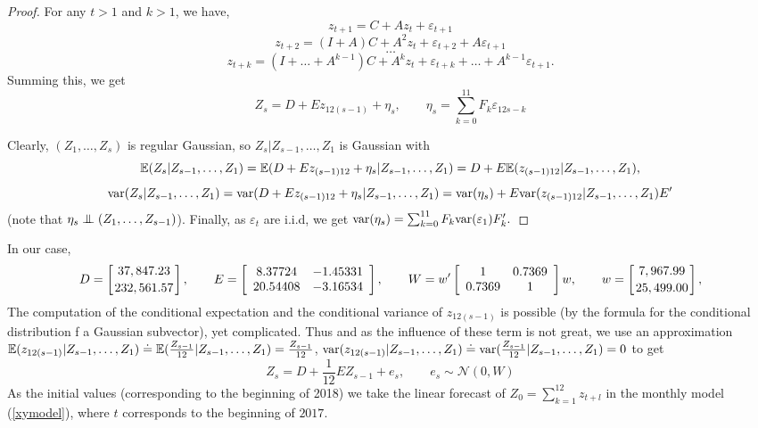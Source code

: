 \documentclass[3p,times]{elsarticle}
\begin{document}
\begin{proof} For any $t>1$ and $k>1$, we have,
$$z_{t+1}=C + A z_{t} + \varepsilon_{t+1}$$
$$z_{t+2}=(I+A)C + A^2 z_{t} + \varepsilon_{t+2}+ A \varepsilon_{t+1}$$
$$\dots$$
$$
z_{t+k} = (I+\dots+A^{k-1}) C + A^k z_t + \varepsilon_{t+k} + \dots + A^{k-1} \varepsilon_{t+1}.
$$
Summing this, we get 
$$
Z_s = D + E z_{12(s-1)}+\eta_s, 
\qquad
\eta_s = \sum_{k=0}^{11} F_k \varepsilon_{12s-k} 
$$


Clearly, $(Z_1,\dots,Z_s)$ is regular Gaussian, so $Z_s|Z_{s-1},\dots,Z_1$ is  Gaussian with
$$
\mathbb{E}(Z_{s}|Z_{s-1},\dots,Z_1)=
\mathbb{E}(D+Ez_{(s-1)12}+\eta_s|Z_{s-1},\dots,Z_1)
=D + E\mathbb{E}(z_{(s-1)12}|Z_{s-1},\dots,Z_1),
$$
$$
\mathrm{var}(Z_{s}|Z_{s-1},\dots,Z_1)=
\mathrm{var}(D+Ez_{(s-1)12}+\eta_s|Z_{s-1},\dots,Z_1)
=\mathrm{var}(\eta_s)+E\mathrm{var}(z_{(s-1)12}|Z_{s-1},\dots,Z_1) E'
$$
(note that $\eta_s\indep (Z_1,\dots,Z_{s-1})$). Finally, as $\varepsilon_t$ are i.i.d, we get 
$
\mathrm{var}(\eta_s) = \sum_{k=0}^{11} F_k \mathrm{var}(\varepsilon_1) F_k'.
$
\end{proof}
In our case, 
$$
D=\left[37,847.23
\atop
232,561.57
\right],
\qquad
E = 
\left[
\begin{array}{cc}
8.37724 & -1.45331 \\
20.54408 & -3.16534
\end{array}
\right],
\qquad 
W = w' 
\left[
\begin{array}{cc}
1 & 0.7369 \\
0.7369 & 1
\end{array}
\right]w,
\qquad 
w =
\left[7,967.99
\atop
25,499.00
\right],
$$
The computation of  the conditional expectation and the conditional variance of $z_{12(s-1)}$ is possible (by the formula for the conditional distribution f a Gaussian subvector), yet complicated. Thus and as the influence of these term is not great, we use an approximation $\mathbb{E}(z_{12(s-1)}|Z_{s-1},\dots,Z_1) \doteq \mathbb{E}(\frac{Z_{s-1}}{12}|Z_{s-1},\dots,Z_1) =\frac{Z_{s-1}}{12}$, $\mathrm{var}(z_{12(s-1)}|Z_{s-1},\dots,Z_1)\doteq \mathrm{var}(\frac{Z_{s-1}}{12}|Z_{s-1},\dots,Z_1)=0$ to get 
$$
Z_s =D+\frac{1}{12} E Z_{s-1} + e_s,\qquad e_s \sim \mathcal{N} (0,W)
$$
As the initial values (corresponding to the beginning of 2018) we take the linear forecast of $Z_0 = \sum_{k=1}^{12} z_{t+l}$ in the monthly model (\ref{xymodel}),  where $t$ corresponds to the beginning of $2017$.
\end{document}
